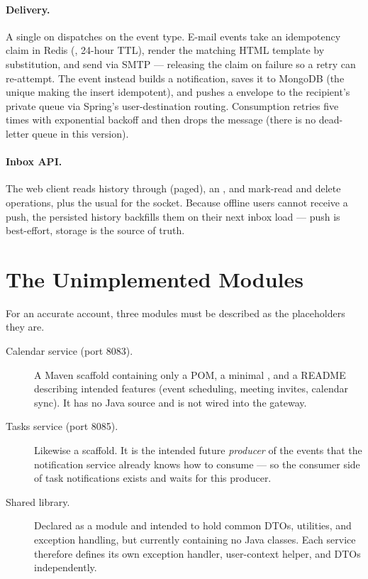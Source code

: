 \paragraph{Delivery.} A single  on
 dispatches on the event type. E-mail events take an
idempotency claim in Redis (, 24-hour
TTL), render the matching HTML template by 
substitution, and send via SMTP --- releasing the claim on failure so a retry can
re-attempt. The  event instead builds a notification, saves
it to MongoDB (the unique  making the insert idempotent), and pushes
a  envelope to the recipient's private
queue via Spring's user-destination routing. Consumption retries five times with
exponential backoff and then drops the message (there is no dead-letter queue in
this version).

\paragraph{Inbox API.} The web client reads history through
 (paged), an , and mark-read
and delete operations, plus the usual  for the socket. Because
offline users cannot receive a push, the persisted history backfills them on their
next inbox load --- push is best-effort, storage is the source of truth.

\section{The Unimplemented Modules}
\label{sec:be-stubs}

For an accurate account, three modules must be described as the placeholders they
are.

\begin{description}
  \item[Calendar service (port 8083).] A Maven scaffold containing only a POM,
  a minimal , and a README describing intended
  features (event scheduling, meeting invites, calendar sync). It has no Java
  source and is not wired into the gateway.
  \item[Tasks service (port 8085).] Likewise a scaffold. It is the intended
  future \emph{producer} of the  events that the notification
  service already knows how to consume --- so the consumer side of task
  notifications exists and waits for this producer.
  \item[Shared library.] Declared as a module and intended to hold common DTOs,
  utilities, and exception handling, but currently containing no Java classes.
  Each service therefore defines its own exception handler, user-context helper,
  and DTOs independently.
\end{description}

